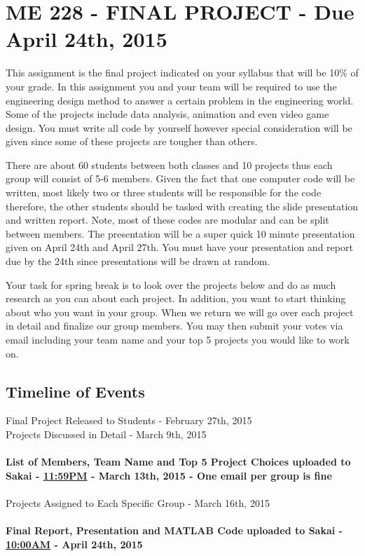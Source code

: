 \section{ME 228 - FINAL PROJECT - Due April 24th, 2015}

This assignment is the final project indicated on your syllabus that
will be 10\% of your grade. In this assignment you and your team will
be required to use the engineering design method to answer a certain
problem in the engineering world. Some of the projects include data
analysis, animation and even video game design. You must write all
code by yourself however special consideration will 
be given since some of these projects are tougher than others. 

There are about 60 students between both classes and 10 projects thus each
group will consist of 5-6 members. Given the fact that one computer code
will be written, most likely two or three students will be responsible
for the code therefore, the other students should be tasked with
creating the slide presentation and written report. Note, most of
these codes are modular and can be split between members. The presentation
will be a super quick 10 minute presentation given on April 24th and
April 27th. You must have your presentation and report due by the 24th
since presentations will be drawn at random.  

Your task  for spring break is to look over the projects below and do 
as much research as you can about each project. In addition, you want
to start thinking about who you want in your group. When we return we
will go over each project in detail and finalize our group
members. You may then submit your votes via email including your team
name and your top 5 projects you would like to work on.

\subsection{\bf Timeline of Events}

Final Project Released to Students - February 27th, 2015\\
Projects Discussed in Detail - March 9th, 2015\\
\ \\
{\bf List of Members, Team Name and Top 5 Project Choices uploaded to Sakai - \underline{11:59PM} - March 13th, 2015 - One email per group is fine}\\
\ \\
Projects Assigned to Each Specific Group - March 16th, 2015\\
\ \\
{\bf Final Report, Presentation and MATLAB Code uploaded to Sakai - \underline{10:00AM} - April 24th, 2015}

